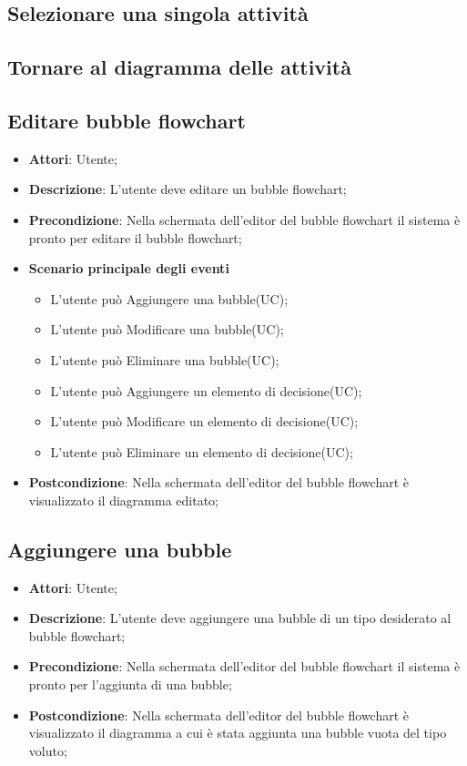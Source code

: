 \documentclass[../AnalisiDeiRequisiti.tex]{subfiles}
\begin{document}
	\subsection{Selezionare una singola attività}
	\subsection{Tornare al diagramma delle attività}
	\subsection{Editare bubble flowchart}
	\begin{itemize}
		\item \textbf{Attori}: Utente;
		\item \textbf{Descrizione}: L'utente deve editare un bubble flowchart;
		\item \textbf{Precondizione}: Nella schermata dell'editor del bubble flowchart il sistema è pronto per editare il bubble flowchart;
		\item \textbf{Scenario principale degli eventi}
		\begin{itemize}
			\item L'utente può Aggiungere una bubble(UC);
			\item L'utente può Modificare una bubble(UC);
			\item L'utente può Eliminare una bubble(UC);
			\item L'utente può Aggiungere un elemento di decisione(UC);
			\item L'utente può Modificare un elemento di decisione(UC);
			\item L'utente può Eliminare un elemento di decisione(UC);
		\end{itemize}
		\item \textbf{Postcondizione}: Nella schermata dell'editor del bubble flowchart è visualizzato il diagramma editato;
	\end{itemize}
	
	\subsection{Aggiungere una bubble}
	\begin{itemize}
		\item \textbf{Attori}: Utente;
		\item \textbf{Descrizione}: L'utente deve aggiungere una bubble di un tipo desiderato al bubble flowchart;
		\item \textbf{Precondizione}: Nella schermata dell'editor del bubble flowchart il sistema è pronto per l'aggiunta di una bubble;
		\item \textbf{Postcondizione}: Nella schermata dell'editor del bubble flowchart è visualizzato il diagramma a cui è stata aggiunta una bubble vuota del tipo voluto;
	\end{itemize}
	
\end{document}

